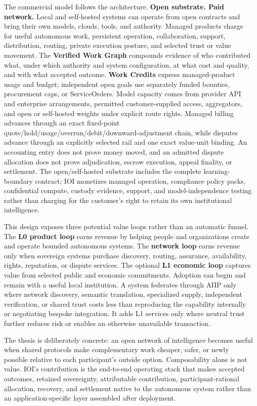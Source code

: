 \documentclass[
  11pt,
]{article}
\begin{document}
The commercial model follows the architecture. \textbf{Open substrate. Paid
network.} Local and self-hosted systems can operate from open contracts and
bring their own models, clouds, tools, and authority. Managed products charge
for useful autonomous work, persistent operation, collaboration, support,
distribution, routing, private execution posture, and selected trust or value
movement. The \textbf{Verified Work Graph} compounds evidence of who
contributed what, under which authority and system configuration, at what cost
and quality, and with what accepted outcome. \textbf{Work Credits} express
managed-product usage and budget; independent open goals use separately funded
bounties, procurement caps, or ServiceOrders. Model capacity comes from
provider API and enterprise arrangements, permitted customer-supplied access,
aggregators, and open or self-hosted weights under explicit route rights.
Managed billing advances through an exact fixed-point
quote/hold/usage/overrun/debit/downward-adjustment chain, while disputes advance
through an explicitly selected rail and one exact value-unit binding. An
accounting entry does not prove money moved, and an admitted dispute allocation
does not prove adjudication, escrow execution, appeal finality, or settlement.
The open/self-hosted substrate includes the complete learning-boundary contract;
IOI monetizes managed operation, compliance policy packs, confidential compute,
custody evidence, support, and model-independence testing rather than charging
for the customer's right to retain its own institutional intelligence.

This design exposes three potential value loops rather than an automatic
funnel. The \textbf{L0 product
loop} earns revenue by helping people and organizations create and operate
bounded autonomous systems. The \textbf{network loop} earns revenue only when
sovereign systems purchase discovery, routing, assurance, availability,
rights, reputation, or dispute services. The optional \textbf{L1 economic
loop} captures value from selected public and economic commitments. Adoption
can begin and remain with a useful local institution. A system federates through
AIIP only where network discovery, semantic translation, specialized supply,
independent verification, or shared trust costs less than reproducing the
capability internally or negotiating bespoke integration. It adds L1 services
only where neutral trust further reduces risk or enables an otherwise
unavailable transaction.

The thesis is deliberately concrete: an open network of intelligence becomes
useful when shared protocols make complementary work cheaper, safer, or newly
possible relative to each participant's outside option. Composability alone is
not value. IOI's contribution is the end-to-end operating stack that makes
accepted outcomes, retained sovereignty, attributable contribution,
participant-rational allocation, recovery, and settlement native to the
autonomous system rather than an application-specific layer assembled after
deployment.
\end{document}
